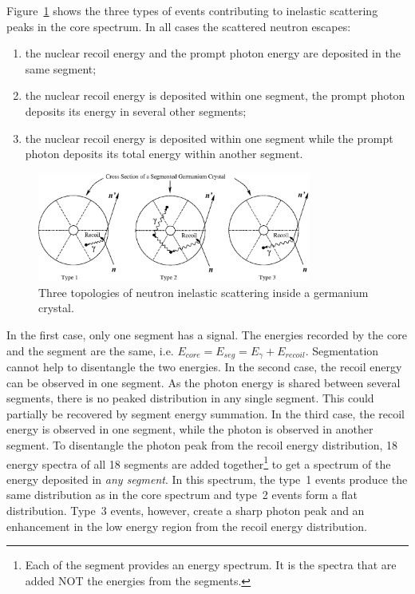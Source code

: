 Figure~\ref{fig:neu:inel} shows the three types of events contributing
to inelastic scattering peaks in the core spectrum. In all cases the
scattered neutron escapes:
\begin{enumerate}
\item the nuclear recoil energy and the prompt photon energy are
deposited in the same segment;
\item the nuclear recoil energy is deposited within one segment, the
prompt photon deposits its energy in several other segments;
\item the nuclear recoil energy is deposited within one segment while
the prompt photon deposits its total energy within another segment.
\end{enumerate}

\begin{figure}[tbhp]
\centering
\includegraphics[width=0.8\textwidth]{ine_1}
\caption{Three topologies of neutron inelastic scattering inside a
germanium crystal.}
\label{fig:neu:inel}
\end{figure}

In the first case, only one segment has a signal. The energies
recorded by the core and the segment are the same, i.e. $E_{core} =
E_{seg} = E_{\gamma} + E_{recoil}$. Segmentation cannot help to
disentangle the two energies. In the second case, the recoil energy
can be observed in one segment. As the photon energy is shared between
several segments, there is no peaked distribution in any single
segment. This could partially be recovered by segment energy
summation. In the third case, the recoil energy is observed in one
segment, while the photon is observed in another segment. To
disentangle the photon peak from the recoil energy distribution, 18
energy spectra of all 18 segments are added together\footnote{Each of
the segment provides an energy spectrum. It is the spectra that are
added NOT the energies from the segments.} to get a spectrum of the
energy deposited in \emph{any segment}. In this spectrum, the type~1
events produce the same distribution as in the core spectrum and
type~2 events form a flat distribution. Type~3 events, however, create
a sharp photon peak and an enhancement in the low energy region from
the recoil energy distribution.

